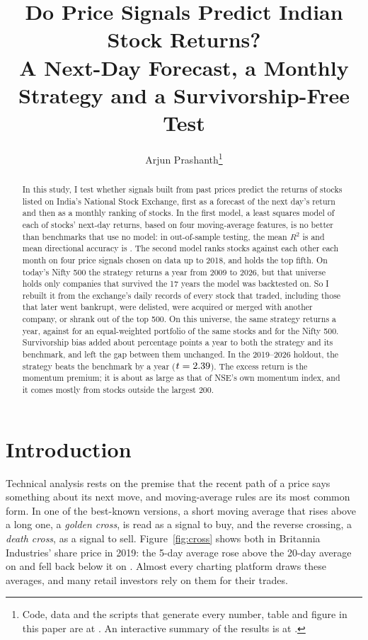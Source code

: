 \documentclass[11pt]{article}
\title{Do Price Signals Predict Indian Stock Returns?\\[0.25em]
  \large\mdseries A Next-Day Forecast, a Monthly Strategy and a Survivorship-Free Test}
\author{Arjun Prashanth\thanks{Code, data and the scripts that generate every number, table and figure in this
  paper are at \weburl{https://github.com/arjunprashanth6129/}{price-prediction-linear-regression}.
  An interactive summary of the results is at
  \weburl{https://arjun-quant-projects.vercel.app/}{linear-regression}.}}
\begin{document}
\maketitle
\thispagestyle{plain}

\begin{abstract}
In this study, I test whether signals built from past prices predict the returns of
stocks listed on India's National Stock Exchange, first as a forecast of the next
day's return and then as a monthly ranking of stocks. In the first model, a least
squares model of each of \NStocks{} stocks' next-day returns, based on four moving-average
features, is no better than benchmarks that use no model: in out-of-sample testing, the mean
$R^2$ is \RsqMean{} and mean directional accuracy is \AccMean. The second model ranks stocks against each other each month 
on four price signals chosen on data up to 2018, and holds the top fifth. On today's Nifty 500 the
strategy returns \SurvCagrFull{} a year from 2009 to 2026, but that universe holds
only companies that survived the 17 years the model was backtested on. So I rebuilt it from the exchange's daily records of every
stock that traded, including those that later went bankrupt, were delisted, were acquired or merged with another company, or shrank out of the top 500. On this universe, the same strategy returns
\PitCagrFull{} a year, against \PitEwCagrFull{} for an equal-weighted portfolio of
the same stocks and \PitNiftyCagrFull{} for the Nifty 500. Survivorship bias added
about \BiasRounded{} percentage points a year to both the strategy and its
benchmark, and left the gap between them unchanged. In the 2019--2026 holdout, the
strategy beats the benchmark by \PitActiveHold{} a year ($t = 2.39$). The
excess return is the momentum premium; it is about as large as that of NSE's own
momentum index, and it comes mostly from stocks outside the largest 200.
\end{abstract}
\clearpage

\section{Introduction}

Technical analysis rests on the premise that the recent path of a price says
something about its next move, and moving-average rules are its most common form.
In one of the best-known versions, a short moving average that rises above a long one, a
\emph{golden cross}, is read as a signal to buy, and the reverse crossing, a
\emph{death cross}, as a signal to sell. Figure~\ref{fig:cross} shows both in
Britannia Industries' share price in 2019: the 5-day average rose above the
20-day average on \CrossGolden{} and fell back below it on \CrossDeath. Almost
every charting platform draws these averages, and many retail investors rely on
them for their trades. 
\end{document}
